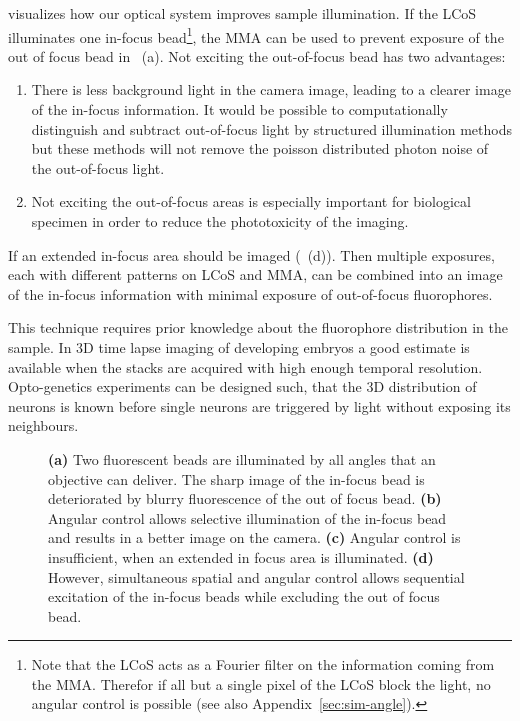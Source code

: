  visualizes how our optical system improves
sample illumination. If the LCoS illuminates one in-focus
bead\footnote{Note that the LCoS acts as a Fourier filter on the
  information coming from the MMA. Therefor if all but a single pixel
  of the LCoS block the light, no angular control is possible (see also Appendix~\ref{sec:sim-angle}).}, the
MMA can be used to prevent exposure of the out of focus bead in
~(a). Not exciting the out-of-focus bead has
two advantages:
\begin{enumerate}
\item There is less background light in the camera image, leading to a
  clearer image of the in-focus information. It would be possible to
  computationally distinguish and subtract out-of-focus light by
  structured illumination methods but these methods will not remove
  the poisson distributed photon noise of the out-of-focus light.
\item Not exciting the out-of-focus areas is especially important for
  biological specimen in order to reduce the phototoxicity of the
  imaging.
\end{enumerate}
If an extended in-focus area should be imaged
(~(d)). Then multiple exposures, each with
different patterns on LCoS and MMA, can be combined into an image of
the in-focus information with minimal exposure of out-of-focus
fluorophores.

This technique requires prior knowledge about the fluorophore
distribution in the sample. In 3D time lapse imaging of developing
embryos a good estimate is available when the stacks are acquired with
high enough temporal resolution. Opto-genetics experiments can be
designed such, that the 3D distribution of neurons is known before
single neurons are triggered by light without exposing its neighbours.

\begin{figure}[!hbt]
  \centering
  \def\svgscale{.43}
  
  \caption{{\bf (a)} Two fluorescent beads are illuminated by all
    angles that an objective can deliver. The sharp image of the
    in-focus bead is deteriorated by blurry fluorescence of the out of
    focus bead. {\bf (b)} Angular control allows selective
    illumination of the in-focus bead and results in a better image on
    the camera. {\bf (c)} Angular control is insufficient, when an
    extended in focus area is illuminated. {\bf (d)} However,
    simultaneous spatial and angular control allows sequential
    excitation of the in-focus beads while excluding the out of focus
    bead.}
  \label{fig:hourglass-all}
\end{figure}
\newpage
